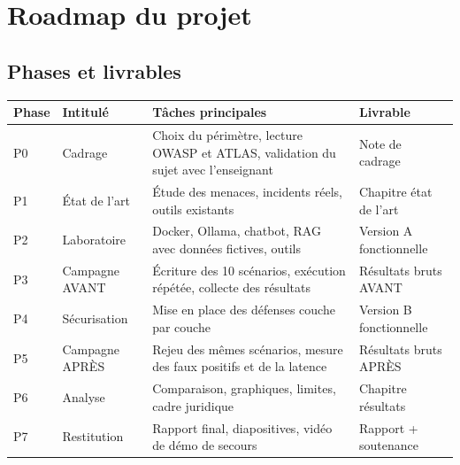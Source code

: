 \documentclass[11pt,a4paper]{article}
\begin{document}
\section{Roadmap du projet}

\subsection{Phases et livrables}
\begin{longtable}{@{}P{1.3cm}P{3.6cm}P{6cm}P{3.6cm}@{}}
\toprule
\textbf{Phase} & \textbf{Intitulé} & \textbf{Tâches principales} & \textbf{Livrable} \\
\midrule
\endhead
P0 & Cadrage & Choix du périmètre, lecture OWASP et ATLAS, validation du sujet avec l'enseignant & Note de cadrage \\
P1 & État de l'art & Étude des menaces, incidents réels, outils existants & Chapitre état de l'art \\
P2 & Laboratoire & Docker, Ollama, chatbot, RAG avec données fictives, outils & Version A fonctionnelle \\
P3 & Campagne AVANT & Écriture des 10 scénarios, exécution répétée, collecte des résultats & Résultats bruts AVANT \\
P4 & Sécurisation & Mise en place des défenses couche par couche & Version B fonctionnelle \\
P5 & Campagne APRÈS & Rejeu des mêmes scénarios, mesure des faux positifs et de la latence & Résultats bruts APRÈS \\
P6 & Analyse & Comparaison, graphiques, limites, cadre juridique & Chapitre résultats \\
P7 & Restitution & Rapport final, diapositives, vidéo de démo de secours & Rapport + soutenance \\
\bottomrule
\end{longtable}
\end{document}
